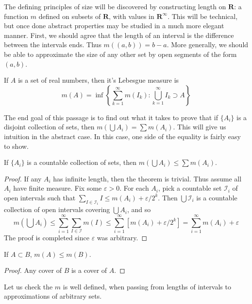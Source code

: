 The defining principles of size will be discovered by constructing length on $\mathbf{R}$: a function $m$ defined on subsets of $\mathbf{R}$, with values in $\mathbf{R}^\infty$. This will be technical, but once done abstract properties may be studied in a much more elegant manner. First, we should agree that the length of an interval is the difference between the intervals ends. Thus $m((a,b)) = b - a$. More generally, we should be able to approximate the size of any other set by open segments of the form $(a,b)$.
%
\begin{definition}
    If $A$ is a set of real numbers, then it's Lebesgue measure is
    \[ m(A) = \inf \left \{ \sum_{k = 1}^\infty m(I_k) : \bigcup_{k = 1}^\infty I_k \supset A \right \} \]
\end{definition}

The end goal of this passage is to find out what it takes to prove that if $\{A_i\}$ is a disjoint collection of sets, then $m(\bigcup A_i) = \sum m(A_i)$. This will give us intuition in the abstract case. In this case, one side of the equality is fairly easy to show.

\begin{theorem}
    If $\{A_i\}$ is a countable collection of sets, then $m(\bigcup A_i) \leq \sum m(A_i)$.
\end{theorem}
\begin{proof}
    If any $A_i$ has infinite length, then the theorem is trivial. Thus assume all $A_i$ have finite measure. Fix some $\varepsilon > 0$. For each $A_i$, pick a countable set $\mathcal{I}_i$ of open intervals such that $\sum_{I \in \mathcal{I}_i} I \leq m(A_i) + \varepsilon/2^k$. Then $\bigcup \mathcal{I}_i$ is a countable collection of open intervals covering $\bigcup A_i$, and so
    \[ m(\bigcup A_i) \leq \sum_{i = 1}^\infty \sum_{I \in \mathcal{I}} m(I) \leq \sum_{i = 1}^\infty [m(A_i) + \varepsilon/2^k] = \sum_{i = 1}^\infty m(A_i) + \varepsilon \]
    The proof is completed since $\varepsilon$ was arbitrary.
\end{proof}

\begin{lemma}
    If $A \subset B$, $m(A) \leq m(B)$.
\end{lemma}
\begin{proof}
    Any cover of $B$ is a cover of $A$.
\end{proof}

Let us check the $m$ is well defined, when passing from lengths of intervals to approximations of arbitrary sets.

